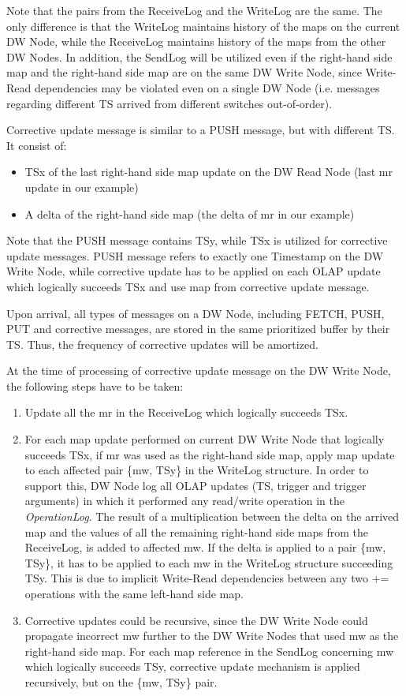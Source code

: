 \documentclass{sig-semester}
\def\OLAP{OLAP\xspace}
\begin{document}
Note that the pairs from the ReceiveLog and the WriteLog are the same. The only difference is that the WriteLog maintains history of the maps on the current DW Node, while the ReceiveLog maintains history of the maps from the other DW Nodes. In addition, the SendLog will be utilized even if the right-hand side map and the right-hand side map are on the same DW Write Node, since Write-Read dependencies may be violated even on a single DW Node (i.e. messages regarding different TS arrived from different switches out-of-order).

Corrective update message is similar to a PUSH message, but with different TS. It consist of:
\begin{itemize}
 \item TSx of the last right-hand side map update on the DW Read Node (last mr update in our example)
 \item A delta of the right-hand side map (the delta of mr in our example)
\end{itemize}

Note that the PUSH message contains TSy, while TSx is utilized for corrective update messages. PUSH message refers to exactly one Timestamp on the DW Write Node, while corrective update has to be applied on each \OLAP update which logically succeeds TSx and use map from corrective update message.

Upon arrival, all types of messages on a DW Node, including FETCH, PUSH, PUT and corrective messages, are stored in the same prioritized buffer by their TS. Thus, the frequency of corrective updates will be amortized.

At the time of processing of corrective update message on the DW Write Node, the following steps have to be taken:
\begin{enumerate}[(1)]
 \item Update all the mr in the ReceiveLog which logically succeeds TSx.

 \item For each map update performed on current DW Write Node that logically succeeds TSx, if mr was used as the right-hand side map, apply map update to each affected pair \{mw, TSy\} in the WriteLog structure. In order to support this, DW Node log all \OLAP updates (TS, trigger and trigger arguments) in which it performed any read/write operation in the \textit{OperationLog}. The result of a multiplication between the delta on the arrived map and the values of all the remaining right-hand side maps from the ReceiveLog, is added to affected mw. If the delta is applied to a pair \{mw, TSy\}, it has to be applied to each mw in the WriteLog structure succeeding TSy. This is due to implicit Write-Read dependencies between any two += operations with the same left-hand side map.

 \item Corrective updates could be recursive, since the DW Write Node could propagate incorrect mw further to the DW Write Nodes that used mw as the right-hand side map. For each map reference in the SendLog concerning mw which logically succeeds TSy, corrective update mechanism is applied recursively, but on the \{mw, TSy\} pair.
\end{enumerate}
\end{document}
